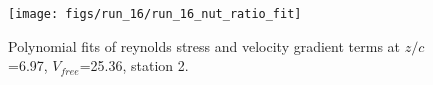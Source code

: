 \begin{figure}[H]
\centering
\texttt{[image: figs/run\_16/run\_16\_nut\_ratio\_fit]}
\caption{Polynomial fits of reynolds stress and velocity gradient terms at $z/c$=6.97, $V_{free}$=25.36, station 2.}
\label{fig:run_16_nut_ratio_fit}
\end{figure}


